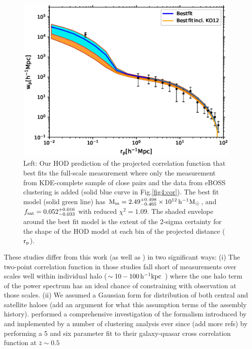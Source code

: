 \documentclass[useAMS,usenatbib]{mn2e}
\begin{document}
\begin{figure}
    \centering
       \includegraphics[angle=0,scale=0.6]{Bestfit_with_wp10c_2pars_1KDE_NOKO12.eps}
    \caption{Left: Our HOD prediction of the projected 
correlation function that best fits the full-scale measurement where only the measurement from KDE-complete sample of close pairs and the data from eBOSS clustering is added (solid blue curve in 
Fig.\ref{fig4:cor}). The best fit model (solid green line) has $\rm M_{m} = 
2.49_{-0.465}^{+0.498} \times 10^{12}\, h^{-1} M_{\odot}$, and $f_{\rm sat} = 
0.052_{-0.033}^{+0.016}$ with reduced $\chi^{2} = 1.09$. The shaded envelope 
around the best fit model is the extent of the 2-sigma certainty for the shape 
of the HOD model at each bin of the projected distance ($\rm r_p$). }\label{fig6:kdeboss}
\end{figure}



 These studies differ from this work (as well as \citep{ko12}) in two 
significant ways: (i) The two-point correlation function in those studies fall 
short of measurements over scales well within individual halo ($\sim 10-100 \, 
\rm h^{-1} kpc$ ) where the one halo term of the power spectrum has an ideal 
chance of constraining with observation at those scales. (ii) We assumed a 
Gaussian form for distribution of both central and satellite haloes (add an 
argument for what this assumption terms of the assembly history). \citet{sh13} 
performed a comprehensive investigation of the formalism introduced by 
\citet{zh05} and implemented by a number of clustering analysis ever since 
\citep{zh07,mi11,zeh11,ric12,ric13}(add more refs) by performing a 5 and six 
parameter fit to their galaxy-quasar cross correlation function at $\bar z \sim 
0.5$  
 
\end{document}
